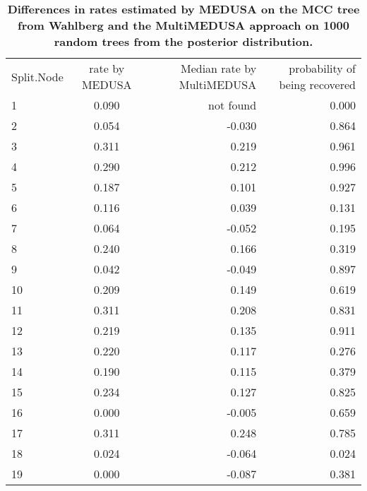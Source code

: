 \documentclass[10pt]{article}
\begin{document}
\begin{table}[!h]
    \caption{\bf{Differences in rates estimated by MEDUSA on the MCC
tree from Wahlberg and the MultiMEDUSA approach on 1000 random trees
from the posterior distribution.}}
\begin{tabular}{lcrr}
Split.Node & rate by MEDUSA & Median rate by MultiMEDUSA & probability of being recovered \\
1          & 0.090          & not found                  & 0.000                          \\
2          & 0.054          & -0.030                     & 0.864                          \\
3          & 0.311          & 0.219                      & 0.961                          \\
4          & 0.290          & 0.212                      & 0.996                          \\
5          & 0.187          & 0.101                      & 0.927                          \\
6          & 0.116          & 0.039                      & 0.131                          \\
7          & 0.064          & -0.052                     & 0.195                          \\
8          & 0.240          & 0.166                      & 0.319                          \\
9          & 0.042          & -0.049                     & 0.897                          \\
10         & 0.209          & 0.149                      & 0.619                          \\
11         & 0.311          & 0.208                      & 0.831                          \\
12         & 0.219          & 0.135                      & 0.911                          \\
13         & 0.220          & 0.117                      & 0.276                          \\
14         & 0.190          & 0.115                      & 0.379                          \\
15         & 0.234          & 0.127                      & 0.825                          \\
16         & 0.000          & -0.005                     & 0.659                          \\
17         & 0.311          & 0.248                      & 0.785                          \\
18         & 0.024          & -0.064                     & 0.024                          \\
19         & 0.000          & -0.087                     & 0.381                         
\end{tabular}
\end{table}
\end{document}
